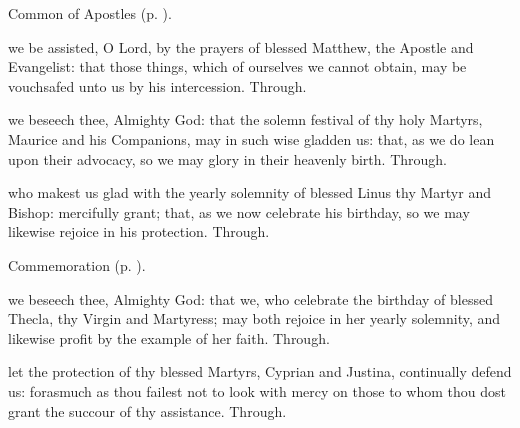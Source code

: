 \clearpage
{}

\begin{rubric}
	Common of Apostles (p. \pageref{CommonApostles}).
\end{rubric}

{} we be assisted, O Lord, by the prayers of blessed Matthew, the Apostle and Evangelist: that those things, which of ourselves we cannot obtain, may be vouchsafed unto us by his intercession. Through.



\memorialCollect
{} we beseech thee, Almighty God: that the solemn festival of thy holy Martyrs, Maurice and his Companions, may in such wise gladden us: that, as we do lean upon their advocacy, so we may glory in their heavenly birth. Through.



\memorialCollect
{} who makest us glad with the yearly solemnity of blessed Linus thy Martyr and Bishop: mercifully grant; that, as we now celebrate his birthday, so we may likewise rejoice in his protection. Through.

\begin{rubric}
    Commemoration  (p. \pageref{TheclaCollect}).
\end{rubric}



\memorialCollect\label{TheclaCollect}
 we beseech thee, Almighty God: that we, who celebrate the birthday of blessed Thecla, thy Virgin and Martyress; may both rejoice in her yearly solemnity, and likewise profit by the example of her faith. Through.



\memorialCollect
{} let the protection of thy blessed Martyrs, Cyprian and Justina, continually defend us: forasmuch as thou failest not to look with mercy on those to whom thou dost grant the succour of thy assistance. Through.


